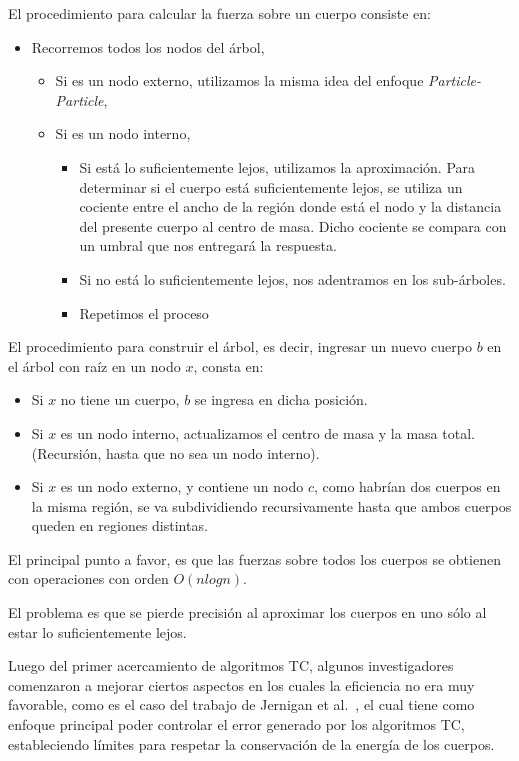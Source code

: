 El procedimiento para calcular la fuerza sobre un cuerpo consiste en:
\begin{itemize}
	\item Recorremos todos los nodos del árbol,
	\begin{itemize}
		\item Si es un nodo externo,
			utilizamos la misma idea del enfoque \emph{Particle-Particle},
		\item Si es un nodo interno,
		\begin{itemize}
			\item Si está lo suficientemente lejos, utilizamos la aproximación.
				Para determinar si el cuerpo está suficientemente lejos,
				se utiliza un cociente entre el ancho de la región donde está
				el nodo y la distancia del presente cuerpo al centro de masa.
				Dicho cociente se compara con un umbral que nos entregará la respuesta.
			\item Si no está lo suficientemente lejos, nos adentramos en los sub-árboles.
		\item Repetimos el proceso
		\end{itemize}
	\end{itemize}
\end{itemize}

El procedimiento para construir el árbol,
es decir, ingresar un nuevo cuerpo $b$ en el árbol
con raíz en un nodo $x$, consta en:
\begin{itemize}
	\item Si $x$ no tiene un cuerpo, $b$ se ingresa en dicha posición.
	\item Si $x$ es un nodo interno, actualizamos el centro de masa y la masa total.
		(Recursión, hasta que no sea un nodo interno).
	\item Si $x$ es un nodo externo, y contiene un nodo $c$,
		como habrían dos cuerpos en la misma región,
		se va subdividiendo recursivamente hasta que ambos cuerpos
		queden en regiones distintas.
\end{itemize}

El principal punto a favor,
es que las fuerzas sobre todos los cuerpos se obtienen con operaciones
con orden $O(n log n)$.

El problema es que se pierde precisión al aproximar los cuerpos
en uno sólo al estar lo suficientemente lejos.

Luego del primer acercamiento de algoritmos TC,
algunos investigadores comenzaron a mejorar ciertos aspectos
en los cuales la eficiencia no era muy favorable,
como es el caso del trabajo de Jernigan et al.~\cite{jernigan},
el cual tiene como enfoque principal poder controlar
el error generado por los algoritmos TC,
estableciendo límites para respetar la conservación
de la energía de los cuerpos.


